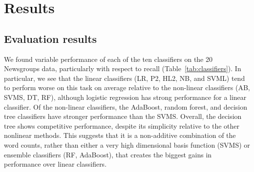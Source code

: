 \documentclass{article} %
\begin{document}
\section{Results}

\subsection{Evaluation results}

We found variable performance of each of the ten classifiers on the 20 Newsgroups data, particularly with respect to recall (Table~\ref{tab:classifiers}). In particular, we see that the linear classifiers (LR, P2, HL2, NB, and SVML) tend to perform worse on this task on average relative to the non-linear classifiers (AB, SVMS, DT, RF), although logistic regression has strong performance for a linear classifier. Of the non-linear classifiers, the AdaBoost, random forest, and decision tree classifiers have stronger performance than the SVMS. Overall, the decision tree shows competitive performance, despite its simplicity relative to the other nonlinear methods. This suggests that it is a non-additive combination of the word counts, rather than either a very high dimensional basis function (SVMS) or ensemble classifiers (RF, AdaBoost), that creates the biggest gains in performance over linear classifiers.
\end{document}
